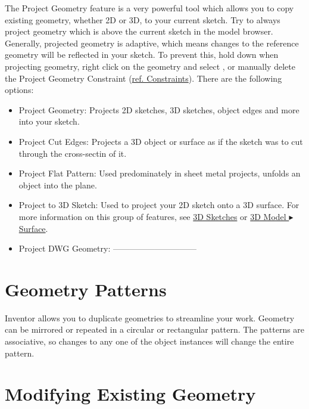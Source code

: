 \cbstart
{}

The Project Geometry feature is a very powerful tool which allows you to copy existing geometry, whether 2D or 3D, to your current sketch. Try to always project geometry which is above the current sketch in the model browser. Generally, projected geometry is adaptive, which means changes to the reference geometry will be reflected in your sketch. To prevent this, hold down  when projecting geometry, right click on the geometry and select , or manually delete the Project Geometry Constraint (\hyperref[chap:constraints]{ref. Constraints}). There are the following options:

\begin{itemize}
\item Project Geometry: Projects 2D sketches, 3D sketches, object edges and more into your sketch.
\item Project Cut Edges: Projects a 3D object or surface as if the sketch was to cut through the cross-sectin of it.
\item Project Flat Pattern: Used predominately in sheet metal projects, unfolds an object into the plane.
\item Project to 3D Sketch: Used to project your 2D sketch onto a 3D surface. For more information on this group of features, see \hyperref[section: 3D Sketches]{3D Sketches} or \hyperref[subsection: 3D Model Surface]{3D Model $\blacktriangleright$ Surface}.
\item Project DWG Geometry:  ------------------------------
\end{itemize}

\cbend

\section{Geometry Patterns}

\cbstart
{}

Inventor allows you to duplicate geometries to streamline your work. Geometry can be mirrored or repeated in a circular or rectangular pattern. The patterns are associative, so changes to any one of the object instances will change the entire pattern.

\cbend

\section{Modifying Existing Geometry}

